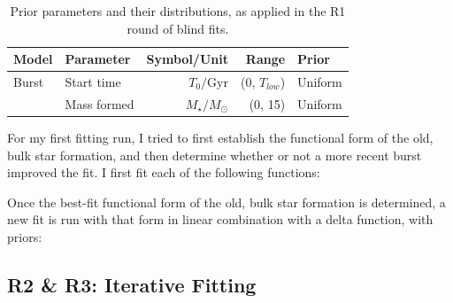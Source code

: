 \documentclass[a4paper,11pt]{article}
\begin{document}
\begin{table}
  \centering
  \begin{tabular}{l l r r l}
    Model & Parameter   & Symbol/Unit        & Range           & Prior   \\
    \hline \hline
    Burst & Start time  & $T_0/\mathrm{Gyr}$ & (0, $T_{low}$)  & Uniform \\
          & Mass formed & $M_\star/M_\odot$  & (0, 15)         & Uniform \\
    \hline
  \end{tabular}
  \caption{Prior parameters and their distributions, as applied in the R1 round of blind fits.}
  \label{tab:r1_burst_priors}
\end{table}

For my first fitting run, I tried to first establish the functional form of the
old, bulk star formation, and then determine whether or not a more recent burst
improved the fit. I first fit each of the following functions:

Once the best-fit functional form of the old, bulk star formation is determined, a new fit is run with that form in linear combination with a delta function, with priors:

\subsection{R2 \& R3: Iterative Fitting}\label{sec:r2_and_r3}
\end{document}
